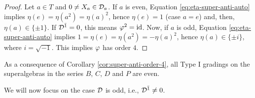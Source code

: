\documentclass{amsbook}
\begin{document}
\begin{proof}
    Let $a\in T$ and $0 \neq X_a \in \mathcal{D}_a$. If $a$ is even, Equation \eqref{eq:eta-super-anti-auto} implies $\eta(e) = \eta (a^2) = \eta(a)^2$, hence $\eta(e) = 1$ (case $a=e$) and, then,  $\eta(a) \in \{ \pm 1 \}$. If $\mathcal{D}^{\bar1} = 0$, this means $\varphi^2 = \operatorname{id}$. Now, if $a$ is odd, Equation \eqref{eq:eta-super-anti-auto} implies $1 = \eta(e) = \eta (a^2) = - \eta(a)^2$, hence $\eta(a) \in \{ \pm i \}$, where $i = \sqrt{-1}$. This implies $\varphi$ has order $4$.
\end{proof}

As a consequence of Corollary \ref{cor:super-anti-order-4}, all Type I gradings on the superalgebras in the series $B$, $C$, $D$ and $P$ are even.

We will now focus on the case $\mathcal{D}$ is odd, i.e., $\mathcal{D}^{\bar1} \neq 0$.
\end{document}
